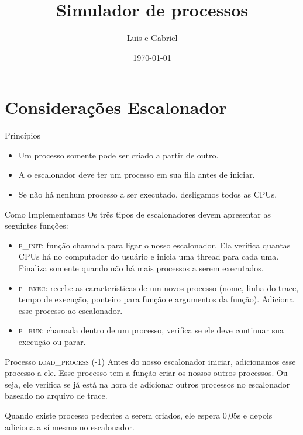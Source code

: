 \documentclass{beamer}
\title{Simulador de processos}
\date{\today}
\author{Luis e Gabriel}
\institute{Centre for Modern Beamer Themes}
\begin{document}
\maketitle

\section{Considerações Escalonador}
\begin{frame}{Princípios}
	\begin{itemize}
		\item Um processo somente pode ser criado a partir de outro.
		\item A o escalonador deve ter um processo em sua fila antes de iniciar.
		\item Se não há nenhum processo a ser executado, desligamos todos as CPUs.
	\end{itemize}
\end{frame}


\begin{frame}{Como Implementamos}
	Os três tipos de escalonadores devem apresentar as seguintes funções:
	\begin{itemize}
		\item \textsc{p\_init}: função chamada para ligar o nosso escalonador. Ela verifica quantas CPUs há no computador do usuário e inicia uma thread para cada uma. Finaliza somente quando não há mais processos a serem executados.
		\item \textsc{p\_exec}: recebe as características de um novos processo (nome, linha do trace, tempo de execução, ponteiro para função e argumentos da função). Adiciona esse processo ao escalonador.
		\item \textsc{p\_run}: chamada dentro de um processo, verifica se ele deve continuar sua execução ou parar.
	\end{itemize}
\end{frame}


\begin{frame}{Processo \textsc{load\_process} (-1)}
	\justifying
	Antes do nosso escalonador iniciar, adicionamos esse processo a ele. Esse processo tem a função criar os nossos outros processos. Ou seja, ele verifica se já está na hora de adicionar outros processos no escalonador baseado no arquivo de trace. 
	
	Quando existe processo pedentes a serem criados, ele espera 0,05s e depois adiciona a sí mesmo no escalonador. 
\end{frame}
\end{document}
